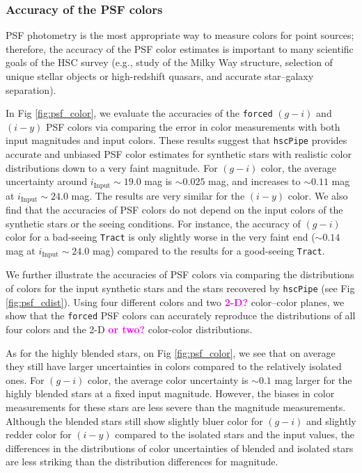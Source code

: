 \documentclass[useamsfonts]{pasj01}
\def\hscpipe{\texttt{hscPipe}}
\def\forced{\texttt{forced}}
\def\tract{\texttt{Tract}}
\newcommand{\susan}[1]{\textcolor{magenta} {\textbf{#1}}}
\begin{document}
\subsubsection{Accuracy of the PSF colors}

    PSF photometry is the most appropriate way to measure colors for point
    sources; therefore, the accuracy of the PSF color estimates is important to many scientific goals of the HSC survey
    (e.g., study of the Milky Way structure, selection of unique stellar objects or
    high-redshift quasars, and accurate star--galaxy separation).

    In Fig \ref{fig:psf_color}, we evaluate the accuracies of the \forced{} $(g-i)$
    and $(i-y)$ PSF colors via comparing the error in color measurements with both
    input magnitudes and input colors.
    These results suggest that \hscpipe{} provides accurate and unbiased PSF color
    estimates for synthetic stars with realistic color distributions down to a very faint
    magnitude.
    For $(g-i)$ color, the average uncertainty around $i_{\mathrm{Input}}{\sim}19.0$ mag
    is ${\sim}0.025$ mag, and increases to ${\sim}0.11$ mag at
    $i_{\mathrm{Input}}{\sim}24.0$ mag.
    The results are very similar for the $(i-y)$ color.
    We also find that the accuracies of PSF colors do not depend on the input colors of
    the synthetic stars or the seeing conditions.
    For instance, the accuracy of $(g-i)$ color for a bad-seeing \tract{} is only 
    slightly worse in the very faint end (${\sim}0.14$ mag at
    $i_{\mathrm{Input}}{\sim}24.0$ mag) compared to the results for a good-seeing \tract{}.

    We further illustrate the accuracies of PSF colors via comparing the distributions
    of colors for the input synthetic stars and the stars recovered by \hscpipe{}
    (see Fig \ref{fig:psf_cdist}).
    Using four different colors and two \susan{2-D?} color--color planes, we show that the \forced{}
    PSF colors can accurately reproduce the distributions of all four colors and the
    2-D \susan{or two?} color-color distributions.

    As for the highly blended stars, on Fig \ref{fig:psf_color}, we see that on average
    they still have larger uncertainties in colors compared to the relatively isolated
    ones.
    For $(g-i)$ color, the average color uncertainty is ${\sim}0.1$ mag larger for the
    highly blended stars at a fixed input magnitude.
    However, the biases in color measurements for these stars are less severe than
    the magnitude measurements.
    Although the blended stars still show slightly bluer color for $(g-i)$ and slightly redder color for $(i-y)$ 
    compared to the isolated stars and the input values, the differences in the
    distributions of color uncertainties of blended and isolated stars are less striking
    than the distribution differences for magnitude.
\end{document}
